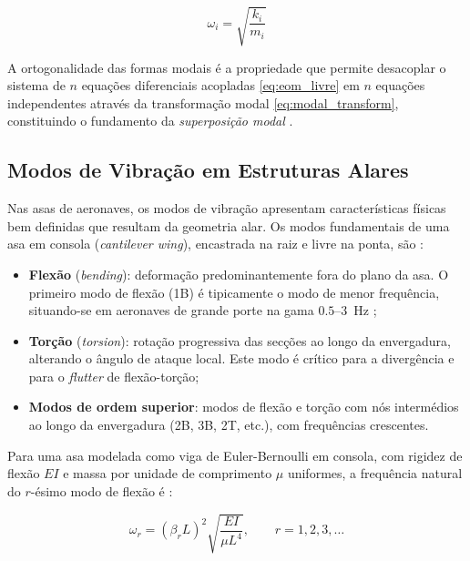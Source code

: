 \documentclass[11pt,oneside,a4paper,final]{report}
\begin{document}
\begin{equation}
    \omega_i = \sqrt{\frac{k_i}{m_i}}
    \label{eq:omega_sdof}
\end{equation}

A ortogonalidade das formas modais é a propriedade que permite desacoplar o sistema de $n$ equações diferenciais acopladas \eqref{eq:eom_livre} em $n$ equações independentes através da transformação modal \eqref{eq:modal_transform}, constituindo o fundamento da \textit{superposição modal} \cite{Craig2006}.

\subsection{Modos de Vibração em Estruturas Alares}

Nas asas de aeronaves, os modos de vibração apresentam características físicas bem definidas que resultam da geometria alar. Os modos fundamentais de uma asa em consola (\textit{cantilever wing}), encastrada na raiz e livre na ponta, são \cite{Bisplinghoff1996, Wright2015}:

\begin{itemize}
    \item \textbf{Flexão} (\textit{bending}): deformação predominantemente fora do plano da asa. O primeiro modo de flexão (1B) é tipicamente o modo de menor frequência, situando-se em aeronaves de grande porte na gama $0.5$--$3$~\si{\hertz} \cite{Megson2012};

    \item \textbf{Torção} (\textit{torsion}): rotação progressiva das secções ao longo da envergadura, alterando o ângulo de ataque local. Este modo é crítico para a divergência e para o \textit{flutter} de flexão-torção;

    \item \textbf{Modos de ordem superior}: modos de flexão e torção com nós intermédios ao longo da envergadura (2B, 3B, 2T, etc.), com frequências crescentes.
\end{itemize}

Para uma asa modelada como viga de Euler-Bernoulli em consola, com rigidez de flexão $EI$ e massa por unidade de comprimento $\mu$ uniformes, a frequência natural do $r$-ésimo modo de flexão é \cite{Rao2011}:

\begin{equation}
    \omega_r = \left(\beta_r L\right)^2 
    \sqrt{\frac{EI}{\mu L^4}}, \qquad r = 1, 2, 3, \ldots
    \label{eq:freq_viga}
\end{equation}
\end{document}
